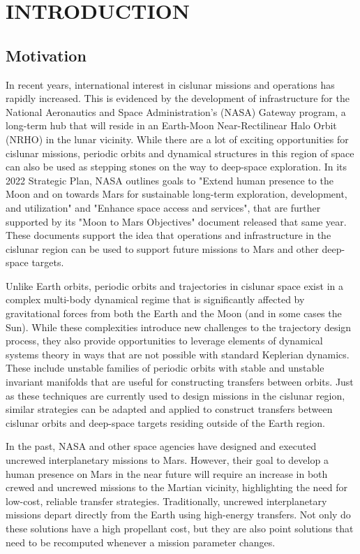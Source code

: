\chapter{INTRODUCTION}
\section{Motivation}
In recent years, international interest in cislunar missions and
operations has rapidly increased. This is evidenced by the development of
infrastructure for the National Aeronautics and Space Administration's (NASA) Gateway program, a
long-term hub that will reside in an Earth-Moon Near-Rectilinear Halo Orbit (NRHO) in the lunar
vicinity\cite{Zamora:2024}. While there are a lot of exciting opportunities for cislunar missions,
periodic orbits and dynamical structures in this region of space can also be used as stepping
stones on the way to deep-space exploration. In its 2022 Strategic Plan, NASA outlines goals to "Extend human presence to the Moon and on
towards Mars for sustainable long-term exploration, development, and utilization" and "Enhance
space access and services"\cite{NASA:2022s}, that are further supported by its "Moon to Mars
Objectives" document released that same year\cite{NASA:2022m}. These documents support the idea
that operations and infrastructure in the cislunar region can be used to support future missions to
Mars and other deep-space targets.

Unlike Earth orbits, periodic orbits and trajectories in cislunar space exist in a complex
multi-body dynamical regime that is significantly affected by gravitational forces from both the
Earth and the Moon (and in some cases the Sun). While these complexities introduce new challenges
to the trajectory design process, they also provide opportunities to leverage elements of dynamical
systems theory in ways that are not possible with standard Keplerian dynamics. These include
unstable families of periodic orbits with stable and unstable invariant manifolds that are useful
for constructing transfers between orbits. Just as these techniques are currently used to design
missions in the cislunar region, similar strategies can be adapted and applied to construct
transfers between cislunar orbits and deep-space targets residing outside of the Earth region.

In the past, NASA and other space agencies have designed and executed uncrewed interplanetary
missions to Mars. However, their goal to develop a human presence on Mars in the near future will require an increase in both crewed and uncrewed missions to the Martian vicinity,
highlighting the need for low-cost, reliable transfer strategies. Traditionally, uncrewed
interplanetary missions depart directly from the Earth using high-energy
transfers\cite{Drake:2009}. Not only do these solutions have a high propellant cost, but they are
also point solutions that need to be recomputed whenever a mission parameter
changes.

